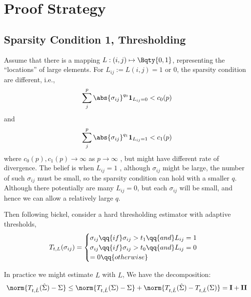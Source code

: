 \documentclass[12pt]{article}
\newcommand{\indicator}[1]{\mathbf{1}_{#1}}
\newcommand{\itm}[1]{\mathbf{#1}}
\begin{document}
    \section{Proof Strategy}
    \subsection{Sparsity Condition 1, Thresholding}
        Assume that there is a mapping \(L:(i,j) \mapsto \Bqty{0,1}\), representing the ``locations'' of large elements. For \(L_{ij} := L(i,j) = 1\) or \(0\),  the sparsity condition are different, i.e.,
        \begin{equation*}
            \sum_{j}^{p} \abs{\sigma_{ij}}^{q_{0}} \indicator{L_{ij} = 0} < c_{0}(p)
        \end{equation*}
        and 
        \begin{equation*}
            \sum_{j}^{p} \abs{\sigma_{ij}}^{q_{1}} \indicator{L_{ij} = 1} < c_{1}(p)
        \end{equation*}
        where \(c_{0}(p), c_{1}(p)\to \infty\) as \(p\to \infty\) , but might have different rate of divergence. The belief is when \(L_{ij}  = 1\) , although \(\sigma_{ij}\) might be large, the number of such \(\sigma_{ij}\) must be small, so the sparsity condition can hold with a smaller \(q\). Although there potentially are many \(L_{ij} = 0\), but each \(\sigma_{ij}\) will be small, and hence we can allow a relatively large \(q\). 
        

        Then following bickel, consider a hard thresholding estimator with adaptive thresholds, 
        \begin{equation*}
            T_{t,L}(\sigma_{ij}) = 
            \begin{cases}
                \sigma_{ij} \qq{if} \sigma_{ij} > t_{1} \qq{and} L_{ij} = 1 \\
                \sigma_{ij} \qq{if} \sigma_{ij} > t_{0} \qq{and} L_{ij} = 0 \\
                = 0 \qq{otherwise}
            \end{cases}
        \end{equation*}

        In practice we might estimate \(L\) with \(\hat{L}\), 
        We have the decomposition:
        \begin{equation*}
            \norm{T_{t,\hat{L}} (\hat{\Sigma}) - \Sigma} \leq \norm{T_{t,\hat{L}}(\Sigma) - \Sigma} + \norm{T_{t,\hat{L}}(\hat{\Sigma}) - T_{t,\hat{L}} (\Sigma)} = \itm{I} + \itm{II}
        \end{equation*}
\end{document}
